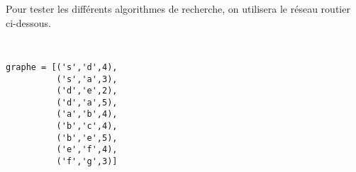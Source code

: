 Pour tester les différents algorithmes de recherche, on utilisera le 
réseau routier ci-dessous.
\vspace*{2mm}

\noindent\begin{minipage}{5.25cm}
\setlength\unitlength{0.6cm}\footnotesize
\reseau
\end{minipage}
\hfill
\begin{minipage}{5cm}\footnotesize\tt
\begin{Verbatim}
graphe = [('s','d',4),
          ('s','a',3),
          ('d','e',2),
          ('d','a',5),
          ('a','b',4),
          ('b','c',4),
          ('b','e',5),
          ('e','f',4),
          ('f','g',3)]
\end{Verbatim}
\end{minipage}
\hfill\mbox{}
\vspace*{2mm}


